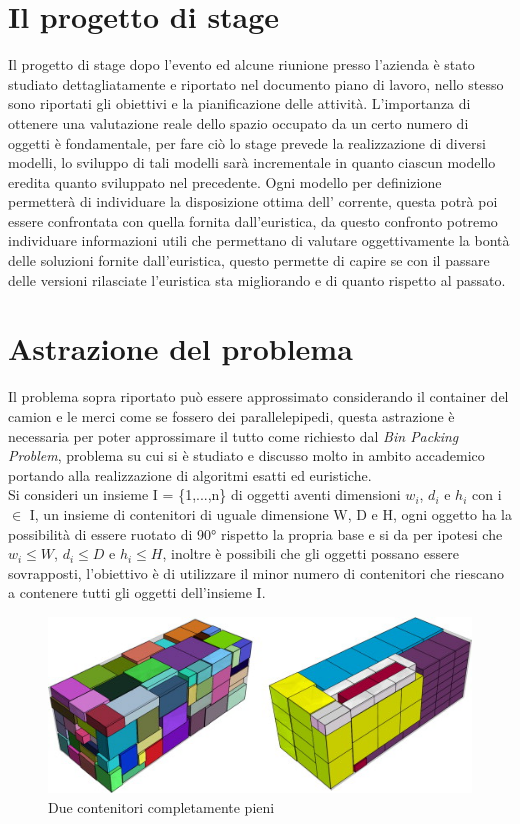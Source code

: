 \section{Il progetto di stage}
Il progetto di stage dopo l'evento  ed alcune riunione presso l'azienda è stato studiato dettagliatamente e riportato nel documento piano di lavoro, nello stesso sono riportati gli obiettivi e la pianificazione delle attività.
L'importanza di ottenere una valutazione reale dello spazio occupato da un certo numero di oggetti è fondamentale, per fare ciò lo stage prevede la realizzazione di diversi modelli, lo sviluppo di tali modelli sarà incrementale in quanto ciascun modello eredita quanto sviluppato nel precedente. Ogni modello per definizione permetterà di individuare la disposizione ottima dell' corrente, questa potrà poi essere confrontata con quella fornita dall'euristica, da questo confronto potremo individuare informazioni utili che permettano di valutare oggettivamente la bontà delle soluzioni fornite dall'euristica, questo permette di capire se con il passare delle versioni rilasciate l'euristica sta migliorando e di quanto rispetto al passato.

\section{Astrazione del problema}
Il problema sopra riportato può essere approssimato considerando il container del camion e le merci come se fossero dei parallelepipedi, questa astrazione è necessaria per poter approssimare il tutto come richiesto dal \textit{Bin Packing Problem}, problema su cui si è studiato e discusso molto in ambito accademico portando alla realizzazione di algoritmi esatti ed euristiche.\\ 
Si consideri un insieme I = \{1,...,n\} di oggetti aventi dimensioni $w_{i}$, $d_{i}$ e $h_{i}$ con i $\in$ I, un insieme di contenitori di uguale dimensione W, D e H, ogni oggetto ha la possibilità di essere ruotato di 90° rispetto la propria base e si da per ipotesi che $w_{i} \leq W$, $d_{i} \leq D$ e $h_{i} \leq H$, inoltre è possibili che gli oggetti possano essere sovrapposti, l'obiettivo è di utilizzare il minor numero di contenitori che riescano a contenere tutti gli oggetti dell'insieme I.\\
\begin{figure}[!ht]
	\begin{center} \includegraphics[scale=0.8]{figures/bin_packing}
		\caption[Bin packing figures]{Due contenitori completamente pieni}  
		\label{fig:ciucia}
	\end{center}
\end{figure}
\newpage
